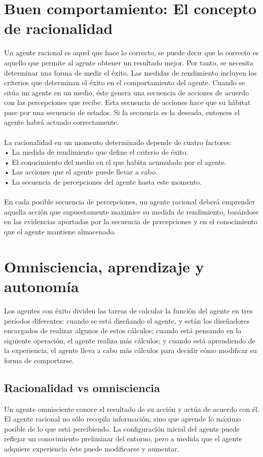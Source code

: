 \documentclass[12pt,a4paper]{report}
\begin{document}
\section{Buen comportamiento: El concepto de racionalidad}
Un agente racional es aquel que hace lo correcto, se puede decir que lo correcto es aquello que permite al agente obtener un resultado mejor. Por tanto, se necesita determinar una forma de medir el éxito. Las medidas de rendimiento incluyen los criterios que determinan el éxito en el comportamiento del agente. Cuando se sitúa un agente en un medio, éste genera una secuencia de acciones de acuerdo con las percepciones que recibe. Esta secuencia de acciones hace que su hábitat pase por una secuencia de estados. Si la secuencia es la deseada, entonces el agente habrá actuado correctamente.\\\\ La racionalidad en un momento determinado depende de cuatro factores:\\• La medida de rendimiento que define el criterio de éxito.\\• El conocimiento del medio en el que habita acumulado por el agente.\\• Las acciones que el agente puede llevar a cabo.\\• La secuencia de percepciones del agente hasta este momento.\\\\En cada posible secuencia de percepciones, un agente racional deberá emprender aquella acción que supuestamente maximice su medida de rendimiento, basándose en las evidencias aportadas por la secuencia de percepciones y en el conocimiento que el agente
mantiene almacenado.
\section{Omnisciencia, aprendizaje y autonomía}
Los agentes con éxito dividen las tareas de calcular la función del agente en tres períodos diferentes: cuando se está diseñando el agente, y están los diseñadores encargados de realizar algunos de estos cálculos; cuando está pensando en la siguiente operación, el agente realiza más cálculos; y cuando está aprendiendo de la experiencia, el agente lleva a cabo más cálculos para decidir cómo modificar su forma de comportarse.
\subsection*{Racionalidad vs omnisciencia}
Un agente omnisciente conoce el resultado de su acción y actúa de acuerdo con él. El agente racional no sólo recopila información, sino que aprende lo máximo posible de lo que está percibiendo. La configuración inicial del agente puede reflejar un conocimiento preliminar del entorno, pero a medida que el agente adquiere experiencia éste puede modificarse y aumentar.
\end{document}

